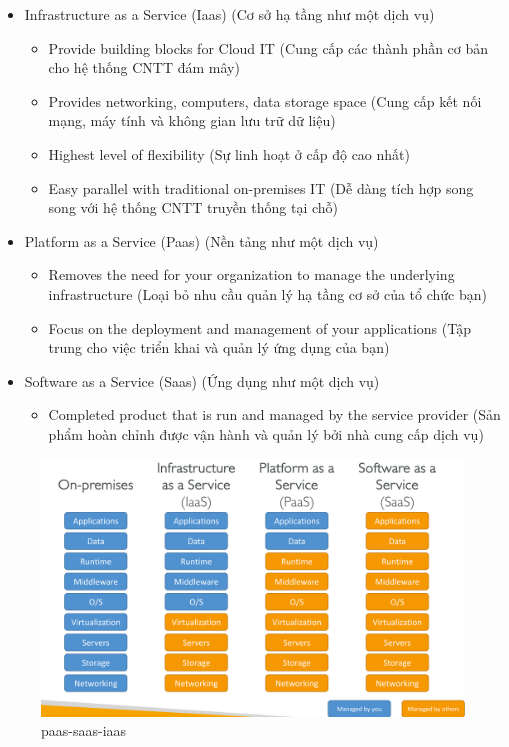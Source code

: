 \begin{itemize}
	\item Infrastructure as a Service (Iaas) (Cơ sở hạ tầng như một dịch vụ)
	\begin{itemize}
		\item Provide building blocks for Cloud IT (Cung cấp các thành phần cơ bản cho hệ thống CNTT đám mây)
		\item Provides networking, computers, data storage space (Cung cấp kết nối mạng, máy tính và không gian lưu trữ dữ liệu)
		\item Highest level of flexibility (Sự linh hoạt ở cấp độ cao nhất)
		\item Easy parallel with traditional on-premises IT (Dễ dàng tích hợp song song với hệ thống CNTT truyền thống tại chỗ)
	\end{itemize}
	\item Platform as a Service (Paas) (Nền tảng như một dịch vụ)
	\begin{itemize}
		\item Removes the need for your organization to manage the underlying infrastructure (Loại bỏ nhu cầu quản lý hạ tầng cơ sở của tổ chức bạn)
		\item Focus on the deployment and management of your applications (Tập trung cho việc triển khai và quản lý ứng dụng của bạn)
	\end{itemize}
	\item Software as a Service (Saas) (Ứng dụng như một dịch vụ)
	\begin{itemize}
		\item Completed product that is run and managed by the service provider (Sản phẩm hoàn chỉnh được vận hành và quản lý bởi nhà cung cấp dịch vụ)
	\end{itemize}
\end{itemize}
\begin{figure}[h]
	\centering
	\includegraphics[width=0.4\linewidth]{images/paas-saas-iaas}
	\caption{paas-saas-iaas}
	\label{fig:paas-saas-iaas}
\end{figure}


